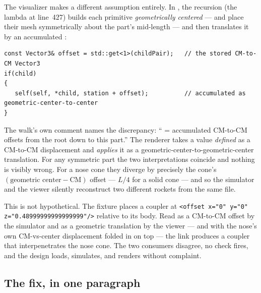 The visualizer makes a different assumption entirely. In , the
 recursion (the lambda at line~427) builds each primitive
\emph{geometrically centered} ---  and  place their mesh symmetrically
about the part's mid-length --- and then translates it by an accumulated :

\begin{verbatim}
const Vector3& offset = std::get<1>(childPair);   // the stored CM-to-CM Vector3
if(child)
{
   self(self, *child, station + offset);          // accumulated as geometric-center-to-center
}
\end{verbatim}

\noindent The walk's own comment names the discrepancy: `` = accumulated CM-to-CM
offsets from the root down to this part.'' The renderer takes a value \emph{defined} as a CM-to-CM
displacement and \emph{applies} it as a geometric-center-to-geometric-center translation. For any
symmetric part the two interpretations coincide and nothing is visibly wrong. For a nose cone they
diverge by precisely the cone's $(\text{geometric center} - \text{CM})$ offset --- $L/4$ for a solid
cone --- and so the simulator and the viewer silently reconstruct two different rockets from the same
file.

\begin{hardfail}
This is not hypothetical. The fixture  places a coupler
at \texttt{<offset x="0" y="0" z="0.48999999999999999"/>} relative to its body. Read as a
CM-to-CM offset by the simulator and as a geometric translation by the viewer --- and with the
nose's own CM-vs-center displacement folded in on top --- the link produces a coupler that
interpenetrates the nose cone. The two consumers disagree, no check fires, and the design loads,
simulates, and renders without complaint. \fail
\end{hardfail}

\subsection{The fix, in one paragraph}

